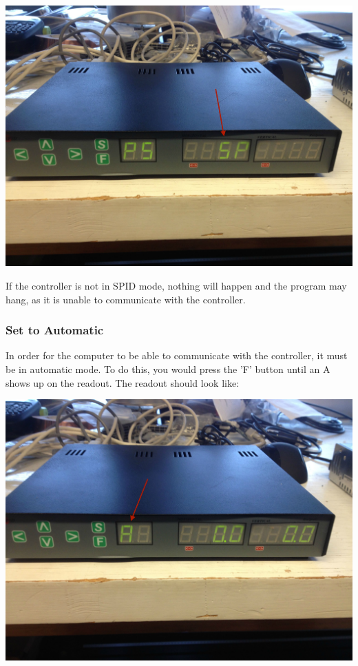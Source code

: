 \documentclass[11pt]{article} %
\begin{document}
\begin{center}
\includegraphics[scale=0.10]{controller/02.jpeg}
\end{center}

If the controller is not in SPID mode, nothing will happen and the program may hang, as it is unable to communicate with the controller.

\subsubsection{Set to Automatic}

In order for the computer to be able to communicate with the controller, it must be in automatic mode. To do this, you would press the 'F' button until an A shows up on the readout. The readout should look like:

\begin{center}
\includegraphics[scale=0.10]{controller/03.jpeg}
\end{center}
\end{document}
